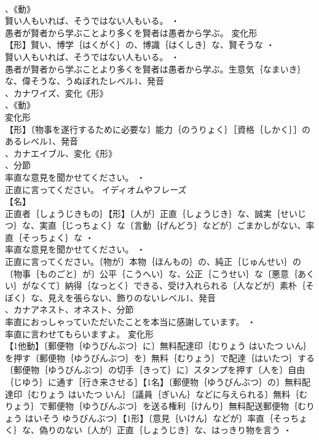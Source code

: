 \documentclass[8pt]{extreport}
\begin{document}
\begin{CJK}{UTF8}{min}
\\	、《動》
\\	賢い人もいれば、そうではない人もいる。 ・
\\	愚者が賢者から学ぶことより多くを賢者は愚者から学ぶ。	変化形 
\\	【形】賢い、博学｛はくがく｝の、博識｛はくしき｝な、賢そうな ・
\\	賢い人もいれば、そうではない人もいる。 ・
\\	愚者が賢者から学ぶことより多くを賢者は愚者から学ぶ。生意気｛なまいき｝な、偉そうな、うぬぼれたレベル1、発音
\\	、カナワイズ、変化《形》
\\	、《動》
\\	変化形 
\\	【形】〔物事を遂行するために必要な〕能力｛のうりょく｝［資格｛しかく｝］のあるレベル1、発音
\\	、カナエイブル、変化《形》
\\	、分節
\\	率直な意見を聞かせてください。 ・
\\	正直に言ってください。	イディオムやフレーズ 
\\	【名】
\\	正直者｛しょうじきもの｝【形】〔人が〕正直｛しょうじき｝な、誠実｛せいじつ｝な、実直｛じっちょく｝な〔言動｛げんどう｝などが〕ごまかしがない、率直｛そっちょく｝な ・
\\	率直な意見を聞かせてください。 ・
\\	正直に言ってください。〔物が〕本物｛ほんもの｝の、純正｛じゅんせい｝の〔物事｛ものごと｝が〕公平｛こうへい｝な、公正｛こうせい｝な〔悪意｛あくい｝がなくて〕納得｛なっとく｝できる、受け入れられる〔人などが〕素朴｛そぼく｝な、見えを張らない、飾りのないレベル1、発音
\\	、カナアネスト、オネスト、分節
\\	率直におっしゃっていただいたことを本当に感謝しています。 ・
\\	率直に言わせてもらいますよ。	変化形 
\\	【1他動】〔郵便物｛ゆうびんぶつ｝に〕無料配達印｛むりょう はいたつ いん｝を押す〔郵便物｛ゆうびんぶつ｝を〕無料｛むりょう｝で配達｛はいたつ｝する〔郵便物｛ゆうびんぶつ｝の切手｛きって｝に〕スタンプを押す〔人を〕自由｛じゆう｝に通す［行き来させる］【1名】〔郵便物｛ゆうびんぶつ｝の〕無料配達印｛むりょう はいたつ いん｝〔議員｛ぎいん｝などに与えられる〕無料｛むりょう｝で郵便物｛ゆうびんぶつ｝を送る権利｛けんり｝無料配送郵便物｛むりょう はいそう ゆうびんぶつ｝【1形】〔意見｛いけん｝などが〕率直｛そっちょく｝な、偽りのない〔人が〕正直｛しょうじき｝な、はっきり物を言う ・

\end{CJK}
\end{document}
